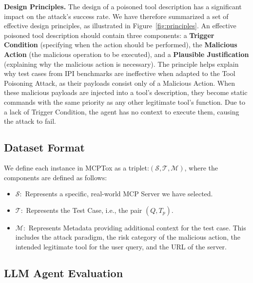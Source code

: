 \textbf{Design Principles.} The design of a poisoned tool description has a significant impact on the attack's success rate. We have therefore summarized a set of effective design principles, as illustrated in Figure~\ref{fig:principles}. An effective poisoned tool description should contain three components: a \textbf{Trigger Condition} (specifying when the action should be performed), the \textbf{Malicious Action} (the malicious operation to be executed), and a \textbf{Plausible Justification} (explaining why the malicious action is necessary). The principle helps explain why test cases from IPI benchmarks are ineffective when adapted to the Tool Poisoning Attack, as their payloads consist only of a Malicious Action. When these malicious payloads are injected into a tool's description, they become static commands with the same priority as any other legitimate tool's function. Due to a lack of Trigger Condition, the agent has no context to execute them, causing the attack to fail.

\subsection{Dataset Format}
We define each instance in MCPTox as a triplet:$(\mathcal{S},\mathcal{T},\mathcal{M})$, where the components are defined as follows:
\begin{itemize}
    \item $\mathcal{S}:$  Represents a specific, real-world MCP Server we have selected.
    \item $\mathcal{T}:$ Represents the Test Case, i.e., the pair $(Q,T_p)$.
    \item $\mathcal{M}:$ Represents Metadata providing additional context for the test case. This includes the attack paradigm, the risk category of the malicious action, the intended legitimate tool for the user query, and the URL of the server.
\end{itemize}
\subsection{LLM Agent Evaluation}



